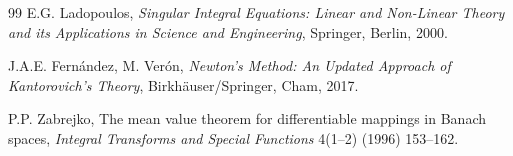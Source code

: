 \documentclass[12pt, a4paper]{article}
\begin{document}
\begin{thebibliography}{99}
E.G. Ladopoulos,
\textit{Singular Integral Equations: Linear and
Non-Linear Theory and its Applications in Science and
Engineering},
Springer, Berlin, 2000.

J.A.E. Fern\'{a}ndez, M. Ver\'{o}n,
\textit{Newton's Method: An Updated Approach of
Kantorovich's Theory},
Birkh\"{a}user/Springer, Cham, 2017.

P.P. Zabrejko,
The mean value theorem for differentiable mappings in
Banach spaces,
\textit{Integral Transforms and Special Functions}
4(1--2) (1996) 153--162.

\end{thebibliography}
\end{document}
